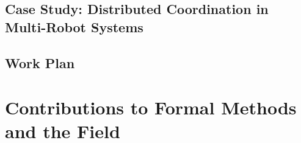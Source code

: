 

\subsection{Case Study: Distributed Coordination in Multi-Robot Systems}
\label{sec:case-study-robots}


\subsection{Work Plan}


\section{Contributions to Formal Methods and the Field}
\label{sec:contributions}
